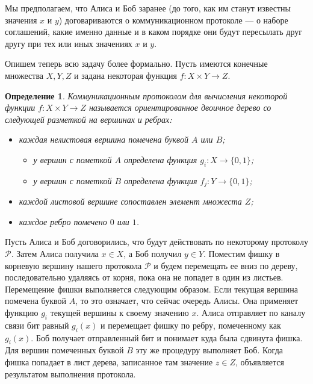 \documentclass[a4paper]{article}
\newtheorem*{mdefinition}{Определение}
\begin{document}
Мы предполагаем, что Алиса и Боб заранее (до того, как им станут известны значения $x$ и $y$)
договариваются о коммуникационном протоколе --- о наборе соглашений, какие именно данные и
в каком порядке они будут пересылать друг другу при тех или иных значениях $x$ и $y$.

Опишем теперь всю задачу более формально. Пусть имеются конечные множества $X, Y, Z$ и задана
некоторая функция $f:X\times Y\rightarrow Z$.

\begin{mdefinition}
    Коммуникационным протоколом для вычисления некоторой функции $f:X\times Y\rightarrow Z$ называется
    ориентированное двоичное дерево со следующей разметкой на вершинах и ребрах:
    \begin{itemize}[noitemsep]
        \item каждая нелистовая вершина помечена буквой $A$ или $B$;
        \begin{itemize}[noitemsep]
			\item у вершин с пометкой $A$ определена функция $g_i:X\rightarrow \{0,1\}$;
			\item у вершин с пометкой $B$ определена функция $f_j:Y\rightarrow \{0,1\}$;
        \end{itemize}
        \item каждой листовой вершине сопоставлен элемент множеста $Z$;
        \item каждое ребро помечено $0$ или $1$.

    \end{itemize}
\end{mdefinition}

Пусть Алиса и Боб договорились, что будут действовать по некоторому протоколу $\mathcal{P}$. Затем
Алиса получила $x\in X$, а Боб получил $y\in Y$. Поместим фишку в корневую вершину нашего протокола
$\mathcal{P}$ и будем перемещать ее вниз по дереву, последовательно удаляясь от корня,
пока она не попадет в один из листьев. Перемещение фишки выполняется следующим образом. Если текущая 
вершина помечена буквой $A$, то это означает, что сейчас очередь Алисы. Она применяет функцию $g_i$ текущей 
вершины к своему значению $x$. Алиса отправляет по каналу связи бит равный $g_i(x)$ и перемещает
фишку по ребру, помеченному как $g_i(x)$. Боб получает отправленный бит и понимает куда была сдвинута фишка.
Для вершин помеченных буквой $B$ эту же процедуру выполняет Боб. Когда фишка попадает в лист дерева,
записанное там значение $z\in Z$, объявляется результатом выполнения протокола.
\end{document}
